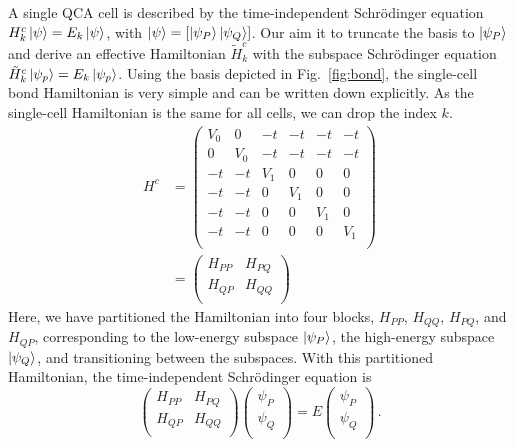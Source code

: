 A single QCA cell is described by the time-independent Schr\"odinger equation
$H^c_k \left|\psi\right> = E_k \left|\psi\right>$, with $\left|\psi\right> = \left[ \left|\psi_P\right>
\left|\psi_Q\right> \right]$. Our aim it to truncate the basis to $\left|\psi_P\right>$ and
derive an effective Hamiltonian $\tilde{H}^c_k$ with the subspace
Schr\"odinger equation $\tilde{H}^c_k \left|\psi_p\right> = E_k \left|\psi_p\right>$. Using
the basis depicted in Fig.~\ref{fig:bond}, the single-cell bond Hamiltonian is
very simple and can be written down explicitly. As the single-cell Hamiltonian
is the same for all cells, we can drop the index $k$.
%
\begin{equation}
\begin{split}
  \label{eq:H_marix}
  H^c
  &=
  \left(
  \begin{array}{cc|cccc}
    V_0 & 0   & -t  & -t  & -t  & -t  \\
    0   & V_0 & -t  & -t  & -t  & -t  \\
    \hline
    -t  & -t  & V_1 & 0   & 0   & 0   \\
    -t  & -t  & 0   & V_1 & 0   & 0   \\
    -t  & -t  & 0   & 0   & V_1 & 0   \\
    -t  & -t  & 0   & 0   & 0   & V_1 \\
  \end{array}
  \right) \\[1em]
  &=
  \left(
  \begin{array}{cc}
    H_{PP} & H_{PQ} \\
    H_{QP} & H_{QQ} \\
  \end{array}
  \right)
\end{split}
\end{equation}
%
Here, we have partitioned the Hamiltonian into four blocks, $H_{PP}$, $H_{QQ}$,
$H_{PQ}$, and $H_{QP}$, corresponding to the low-energy subspace $\left|\psi_P\right>$,
the high-energy subspace $\left|\psi_Q\right>$, and transitioning between the subspaces.
With this partitioned Hamiltonian, the time-independent Schr\"odinger equation is
%
\begin{equation}
  \label{eq:SE}
  \begin{pmatrix}
    H_{PP} & H_{PQ} \\
    H_{QP} & H_{QQ} \\
  \end{pmatrix}
  \begin{pmatrix}
    \psi_P \\
    \psi_Q \\
  \end{pmatrix}
  =
  E
  \begin{pmatrix}
    \psi_P \\
    \psi_Q \\
  \end{pmatrix}
  \, .
\end{equation}
